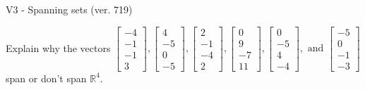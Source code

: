\begin{exercise}
  \begin{exerciseTitle}V3 - Spanning sets (ver. 719)\end{exerciseTitle}
  \begin{exerciseStatement}
    Explain why the vectors \(\left[\begin{array}{r}
-4 \\
-1 \\
-1 \\
3
\end{array}\right] , \left[\begin{array}{r}
4 \\
-5 \\
0 \\
-5
\end{array}\right] , \left[\begin{array}{r}
2 \\
-1 \\
-4 \\
2
\end{array}\right] , \left[\begin{array}{r}
0 \\
9 \\
-7 \\
11
\end{array}\right] , \left[\begin{array}{r}
0 \\
-5 \\
4 \\
-4
\end{array}\right] , \text{ and } \left[\begin{array}{r}
-5 \\
0 \\
-1 \\
-3
\end{array}\right]\) span or don't span \(\mathbb{R}^4\). 
	



\end{exerciseStatement}
\end{exercise}
